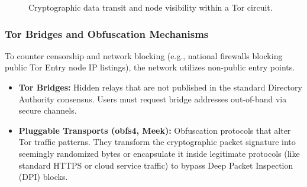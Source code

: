 \begin{figure}[H]
\centering
{}
\caption{Cryptographic data transit and node visibility within a Tor circuit.}
\end{figure}

\subsubsection*{Tor Bridges and Obfuscation Mechanisms}
To counter censorship and network blocking (e.g., national firewalls blocking public Tor Entry node IP listings), the network utilizes non-public entry points.
\begin{itemize}
    \item \textbf{Tor Bridges:} Hidden relays that are not published in the standard Directory Authority consensus. Users must request bridge addresses out-of-band via secure channels.
    \item \textbf{Pluggable Transports (obfs4, Meek):} Obfuscation protocols that alter Tor traffic patterns. They transform the cryptographic packet signature into seemingly randomized bytes or encapsulate it inside legitimate protocols (like standard HTTPS or cloud service traffic) to bypass Deep Packet Inspection (DPI) blocks.
\end{itemize}

